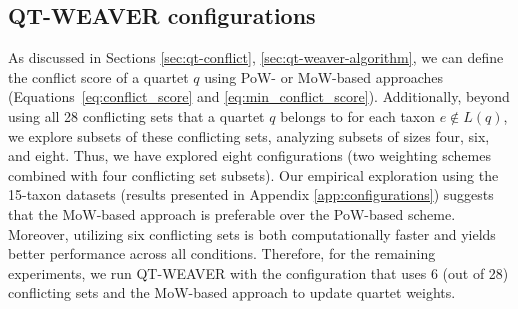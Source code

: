\documentclass[runningheads]{llncs}
\begin{document}
 
 

 
\subsection{QT-WEAVER configurations}
\label{sec:qt-weaver-configuration}
\vspace{-3pt}
As discussed in Sections \ref{sec:qt-conflict}, \ref{sec:qt-weaver-algorithm}, we can define the conflict score of a quartet $q$ using PoW- or MoW-based approaches (Equations~\ref{eq:conflict_score} and \ref{eq:min_conflict_score}). %
Additionally, beyond using all 28 conflicting sets that a quartet $q$ belongs to for each taxon $e \notin L(q)$, we explore subsets of these conflicting sets, analyzing subsets of sizes four, six, and eight. Thus, we have explored eight configurations (two weighting schemes combined with four conflicting set subsets). Our empirical exploration using the 15-taxon datasets (results presented in Appendix \ref{app:configurations}) suggests that the MoW-based approach is preferable over the PoW-based scheme. Moreover, utilizing six conflicting sets is both computationally faster and yields better performance across all conditions. Therefore, for the remaining experiments, we run QT-WEAVER with the configuration that uses 6 (out of 28) conflicting sets and the MoW-based approach to update quartet weights.
\end{document}
